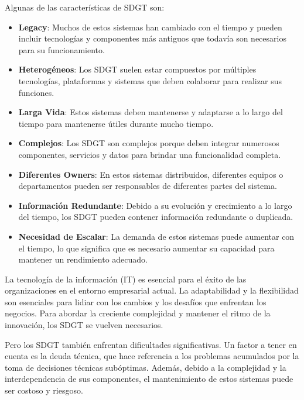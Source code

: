 \documentclass{article}
\begin{document}
			Algunas de las características de SDGT son: 
			\begin{itemize}		
				\item \textbf{Legacy}: Muchos de estos sistemas han cambiado con el tiempo y pueden incluir tecnologías y componentes más antiguos que todavía son necesarios para su funcionamiento.
				
				\item \textbf{Heterogéneos}: Los SDGT suelen estar compuestos por múltiples tecnologías, plataformas y sistemas que deben colaborar para realizar sus funciones.
				
				\item \textbf{Larga Vida}: Estos sistemas deben mantenerse y adaptarse a lo largo del tiempo para mantenerse útiles durante mucho tiempo.
				
				
				\item \textbf{Complejos}: Los SDGT son complejos porque deben integrar numerosos componentes, servicios y datos para brindar una funcionalidad completa.
				
				\item \textbf{Diferentes Owners}: En estos sistemas distribuidos, diferentes equipos o departamentos pueden ser responsables de diferentes partes del sistema.
				
				\item \textbf{Información Redundante}: Debido a su evolución y crecimiento a lo largo del tiempo, los SDGT pueden contener información redundante o duplicada.
				
				\item \textbf{Necesidad de Escalar}: La demanda de estos sistemas puede aumentar con el tiempo, lo que significa que es necesario aumentar su capacidad para mantener un rendimiento adecuado.
				
			\end{itemize}
		
		La tecnología de la información (IT) es esencial para el éxito de las organizaciones en el entorno empresarial actual. La adaptabilidad y la flexibilidad son esenciales para lidiar con los cambios y los desafíos que enfrentan los negocios. Para abordar la creciente complejidad y mantener el ritmo de la innovación, los SDGT se vuelven necesarios.
		
		Pero los SDGT también enfrentan dificultades significativas. Un factor a tener en cuenta es la deuda técnica, que hace referencia a los problemas acumulados por la toma de decisiones técnicas subóptimas. Además, debido a la complejidad y la interdependencia de sus componentes, el mantenimiento de estos sistemas puede ser costoso y riesgoso.
		
\end{document}
